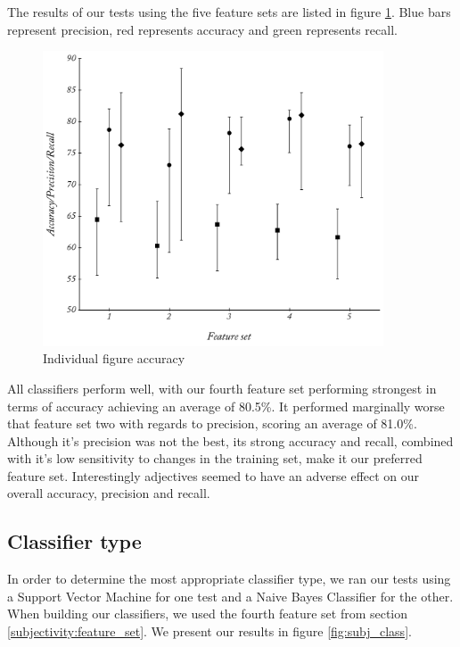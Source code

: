 The results of our tests using the five feature sets are listed in figure \ref{fig:subj_multi}. Blue bars represent precision, red represents accuracy and green represents recall.

\begin{figure}
	\caption{Individual figure accuracy}
	\label{fig:subj_multi}
	\centering
		\includegraphics[width=0.9\textwidth]{graphs/subj_multi.pdf}
\end{figure}

All classifiers perform well, with our fourth feature set performing strongest in terms of accuracy achieving an average of 80.5\%. It performed marginally worse that feature set two with regards to precision, scoring an average of 81.0\%. Although it's precision was not the best, its strong accuracy and recall, combined with it's low sensitivity to changes in the training set, make it our preferred feature set. Interestingly adjectives seemed to have an adverse effect on our overall accuracy, precision and recall.

\subsection{Classifier type}

In order to determine the most appropriate classifier type, we ran our tests using a Support Vector Machine for one test and a Naive Bayes Classifier for the other. When building our classifiers, we used the fourth feature set from section \ref{subjectivity:feature_set}. We present our results in figure \ref{fig:subj_class}.

